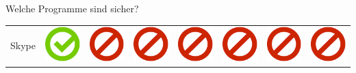 \documentclass[final]{beamer}
\newlength{\twocolwid}
\begin{document}
\begin{frame}[t]
\begin{columns}[t, totalwidth=\textwidth]
\begin{column}{\twocolwid}
\begin{block}{Welche Programme sind sicher?}
\begin{tabular}{ l | C{4cm} | C{4cm} | C{4cm} | C{4.5cm} | C{4cm} | C{5cm} | C{3cm} | }
Skype & \includegraphics[scale=0.5]{pics/haken.png} & \includegraphics[scale=0.5]{pics/nohaken.png} & \includegraphics[scale=0.5]{pics/nohaken.png} & \includegraphics[scale=0.5]{pics/nohaken.png} & \includegraphics[scale=0.5]{pics/nohaken.png} & \includegraphics[scale=0.5]{pics/nohaken.png} & \includegraphics[scale=0.5]{pics/nohaken.png} \tabularnewline

\end{tabular}
\end{block}
\end{column}
\end{columns}
\end{frame}
\end{document}
